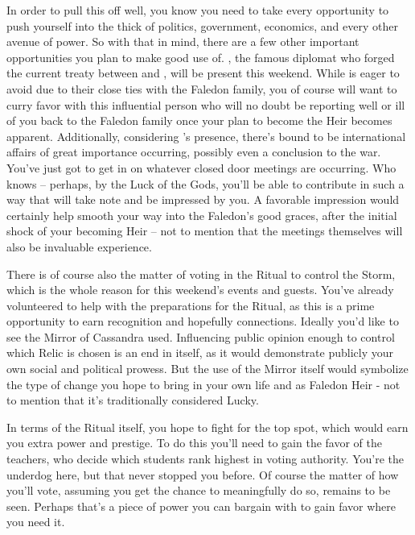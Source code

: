 \documentclass[char]{GL2020}
\begin{document}
In order to pull this off well, you know you need to take every opportunity to push yourself into the thick of politics, government, economics, and every other avenue of power. So with that in mind, there are a few other important opportunities you plan to make good use of. \cDiplomat{}, the famous diplomat who forged the current treaty between \pTech{} and \pFarm{}, will be present this weekend. While \cHeir{} is eager to avoid \cDiplomat{\them} due to their close ties with the Faledon family, you of course will want to curry favor with this influential person who will no doubt be reporting well or ill of you back to the Faledon family once your plan to become the Heir becomes apparent. Additionally, considering \cDiplomat{}’s presence, there’s bound to be international affairs of great importance occurring, possibly even a conclusion to the war.  You’ve just got to get in on whatever closed door meetings are occurring. Who knows -- perhaps, by the Luck of the Gods, you’ll be able to contribute in such a way that \cDiplomat{} will take note and be impressed by you. A favorable impression would certainly help smooth your way into the Faledon’s good graces, after the initial shock of your becoming Heir -- not to mention that the meetings themselves will also be invaluable experience.

There is of course also the matter of voting in the Ritual to control the Storm, which is the whole reason for this weekend’s events and guests. You’ve already volunteered to help with the preparations for the Ritual, as this is a prime opportunity to earn recognition and hopefully connections. Ideally you’d like to see the Mirror of Cassandra used. Influencing public opinion enough to control which Relic is chosen is an end in itself, as it would demonstrate publicly your own social and political prowess. But the use of the Mirror itself would symbolize the type of change you hope to bring in your own life and as Faledon Heir - not to mention that it’s traditionally considered Lucky. 

In terms of the Ritual itself, you hope to fight for the top spot, which would earn you extra power and prestige. To do this you’ll need to gain the favor of the teachers, who decide which students rank highest in voting authority. You’re the underdog here, but that never stopped you before.  Of course the matter of how you’ll vote, assuming you get the chance to meaningfully do so, remains to be seen. Perhaps that’s a piece of power you can bargain with to gain favor where you need it.
\end{document}
